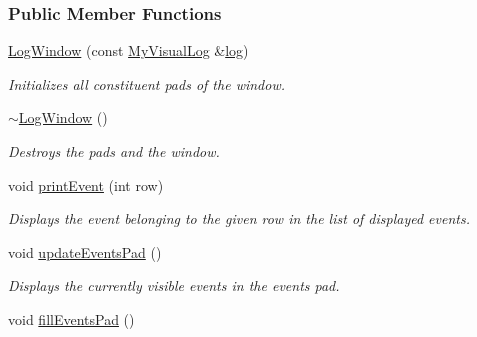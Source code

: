 \subsubsection*{Public Member Functions}
\begin{DoxyCompactItemize}
\item 
\hyperlink{structslb_1_1core_1_1ui_1_1LogWindow_a8ceb8eae6f21dbad28edb2b154341511}{Log\+Window} (const \hyperlink{structslb_1_1core_1_1ui_1_1LogWindow_a740f38763dad694111118ff0ab6349a6}{My\+Visual\+Log} \&\hyperlink{namespaceslb_1_1core_1_1ui_acdeb0db1847459cac6f4eeb22bbb5998}{log})
\begin{DoxyCompactList}\small\item\em Initializes all constituent pads of the window. \end{DoxyCompactList}\item 
\hyperlink{structslb_1_1core_1_1ui_1_1LogWindow_a2bbc4744231a6c78c28beb6b11a88202}{$\sim$\+Log\+Window} ()\hypertarget{structslb_1_1core_1_1ui_1_1LogWindow_a2bbc4744231a6c78c28beb6b11a88202}{}\label{structslb_1_1core_1_1ui_1_1LogWindow_a2bbc4744231a6c78c28beb6b11a88202}

\begin{DoxyCompactList}\small\item\em Destroys the pads and the window. \end{DoxyCompactList}\item 
void \hyperlink{structslb_1_1core_1_1ui_1_1LogWindow_aa224ffc64d9b3564490931c6fdfe25b2}{print\+Event} (int row)
\begin{DoxyCompactList}\small\item\em Displays the event belonging to the given row in the list of displayed events. \end{DoxyCompactList}\item 
void \hyperlink{structslb_1_1core_1_1ui_1_1LogWindow_a7c3b3cff11232822133b1473047bf11f}{update\+Events\+Pad} ()\hypertarget{structslb_1_1core_1_1ui_1_1LogWindow_a7c3b3cff11232822133b1473047bf11f}{}\label{structslb_1_1core_1_1ui_1_1LogWindow_a7c3b3cff11232822133b1473047bf11f}

\begin{DoxyCompactList}\small\item\em Displays the currently visible events in the events pad. \end{DoxyCompactList}\item 
void \hyperlink{structslb_1_1core_1_1ui_1_1LogWindow_a036d3983027e4a58aa4db5ebe28e31c6}{fill\+Events\+Pad} ()\hypertarget{structslb_1_1core_1_1ui_1_1LogWindow_a036d3983027e4a58aa4db5ebe28e31c6}{}\label{structslb_1_1core_1_1ui_1_1LogWindow_a036d3983027e4a58aa4db5ebe28e31c6}


\end{DoxyCompactItemize}
